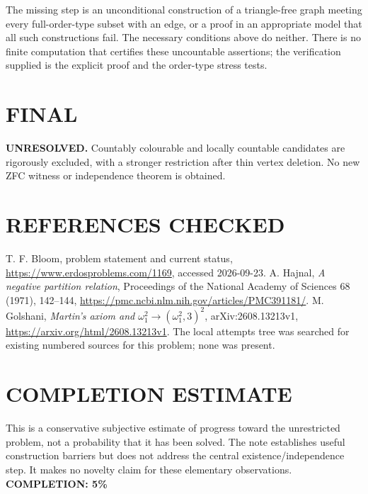 The missing step is an unconditional construction of a triangle-free graph meeting every full-order-type subset with an edge, or a proof in an appropriate model that all such constructions fail. The necessary conditions above do neither. There is no finite computation that certifies these uncountable assertions; the verification supplied is the explicit proof and the order-type stress tests.

\section{FINAL}
\textbf{UNRESOLVED.} Countably colourable and locally countable candidates are rigorously excluded, with a stronger restriction after thin vertex deletion. No new ZFC witness or independence theorem is obtained.

\section{REFERENCES CHECKED}
T. F. Bloom, problem statement and current status, \url{https://www.erdosproblems.com/1169}, accessed 2026-09-23. A. Hajnal, \emph{A negative partition relation}, Proceedings of the National Academy of Sciences 68 (1971), 142--144, \url{https://pmc.ncbi.nlm.nih.gov/articles/PMC391181/}. M. Golshani, \emph{Martin's axiom and $\omega_1^2\longrightarrow(\omega_1^2,3)^2$}, arXiv:2608.13213v1, \url{https://arxiv.org/html/2608.13213v1}. The local attempts tree was searched for existing numbered sources for this problem; none was present.

\section{COMPLETION ESTIMATE}
This is a conservative subjective estimate of progress toward the unrestricted problem, not a probability that it has been solved. The note establishes useful construction barriers but does not address the central existence/independence step. It makes no novelty claim for these elementary observations.
\textbf{COMPLETION: 5\%}
